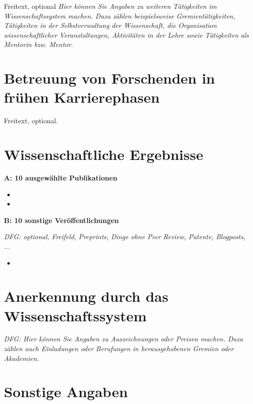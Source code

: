 \documentclass[a4paper,11pt]{article}
\begin{document}
Freitext, optional
\emph{Hier können Sie Angaben zu weiteren Tätigkeiten im
  Wissenschaftssystem machen. Dazu zählen beispielsweise
  Gremientätigkeiten, Tätigkeiten in der Selbstverwaltung der
  Wissenschaft, die Organisation wissenschaftlicher Veranstaltungen,
  Aktivitäten in der Lehre sowie Tätigkeiten als Mentorin
  bzw. Mentor.}

\section*{Betreuung von Forschenden in frühen Karrierephasen}%

Freitext, optional.

\section*{Wissenschaftliche Ergebnisse}

\textbf{A: 10 ausgewählte Publikationen}

\medskip

\begin{itemize}
  \item {}
  \item {}
\end{itemize}

\medskip 

\textbf{B: 10 sonstige Veröffentlichungen}

\emph{DFG: optional, Freifeld, Preprints, Dinge ohne Peer Review, Patente, Blogposts, ...}

\begin{itemize}
  \item {}
\end{itemize}

\section*{Anerkennung durch das Wissenschaftssystem}

\emph{DFG: Hier können Sie Angaben zu Auszeichnungen oder Preisen
  machen. Dazu zählen auch Einladungen oder Berufungen in
  herausgehobenen Gremien oder Akademien.  }

\section*{Sonstige Angaben}
\end{document}

